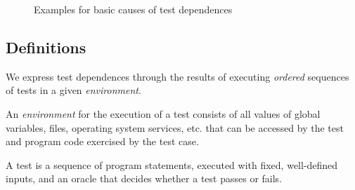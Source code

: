 \begin{figure}
\caption{Examples for basic causes of test
dependences}\label{fig:dep_examples}
\end{figure}

\subsection{Definitions}
\label{sec:definitions}

We express test dependences through the results of executing
\emph{ordered} sequences of tests in a given \emph{environment}.


\begin{definition}[Environment]
An \emph{environment} \env for the execution of a test
consists of all values of global variables, files,
operating
system services, etc. that
can be accessed by the test and program code exercised by the test
case.
%
\end{definition}

\begin{definition}[Test]
%

A test is a sequence of program statements, executed with fixed,
well-defined inputs, and an oracle that
decides whether a test passes or fails.
\end{definition}

